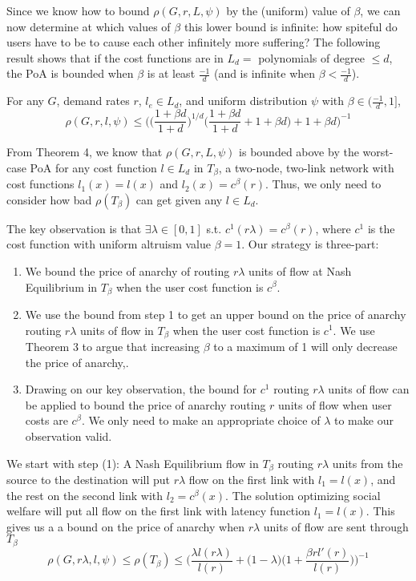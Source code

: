 Since we know how to bound $\rho(G,r,{L},\psi)$ by the (uniform) value of $\beta$, we can now determine at which values of $\beta$ this lower bound is infinite: how spiteful do users have to be to cause each other infinitely more suffering? The following result shows that if the cost functions are in $L_d =$ polynomials of degree $\le d$, the PoA is bounded when $\beta$ is at least $\frac{-1}{d}$ (and is infinite when $\beta < \frac{-1}d$).
\begin{theorem}
For any $G$, demand rates $r$, $l_e \in L_d$,
and uniform distribution $\psi$ with $\beta \in (\frac{-1}{d}, 1]$,
    $$\rho(G,r,l,\psi) \le \Big(\Big(\frac{1+\beta d}{1+d}\Big)^{1/d}\Big(\frac{1+\beta d}{1+d} + 1 + \beta d\Big)+ 1 + \beta d\Big)^{-1}$$
\end{theorem}
\begin{proof-sketch}
From Theorem 4, we know that 
$\rho(G,r,{L},\psi)$%
 is bounded above by the worst-case PoA for any cost function $l \in L_d$ in $T_\beta$, a two-node, two-link network with cost functions $l_1(x) = l(x)$ and $l_2(x) = c^\beta(r)$.
Thus, we only need to consider how bad $\rho(T_\beta)$ can get given any $l\in L_d$.

The key observation is that $\exists\lambda \in [0,1]$ s.t. $c^1(r\lambda) = c^\beta(r)$, where $c^1$ is the cost function with uniform altruism value $\beta=1$. Our strategy is three-part: 
\begin{enumerate}
    \item We bound the price of anarchy of routing $r\lambda$ units of flow at Nash Equilibrium in $T_\beta$ when the user cost function is $c^\beta$.
   \item We use the bound from step 1 to get an upper bound on the price of anarchy routing $r\lambda$ units of flow in $T_\beta$ when the user cost function is $c^1$. We use Theorem 3 to argue that increasing $\beta$ to a maximum of 1 will only decrease the price of anarchy,. 
    \item Drawing on our key observation, the bound for $c^1$ routing $r\lambda$ units of flow can be applied to bound the price of anarchy routing $r$ units of flow when user costs are $c^\beta$.
We only need to make an appropriate choice of $\lambda$ to make our observation valid.
\end{enumerate}

We start with step (1): A Nash Equilibrium flow in $T_\beta$ routing $r\lambda$ units from the source to the destination will put $r\lambda$ flow on the first link with $l_1 = l(x)$, and the rest on the second link with $l_2 = c^\beta(x)$. The solution optimizing social welfare will put all flow on the first link with latency function $l_1 = l(x)$.
This gives us a a bound on the price of anarchy when $r\lambda$ units of flow are sent through $T_\beta$ 
    $$\rho(G,r\lambda,l,\psi) \le \rho(T_\beta) \le \Big(\frac{\lambda l(r\lambda)}{l(r)} + \Big(1-\lambda\Big)\Big(1+\frac{\beta rl'(r)}{l(r)}\Big)\Big)^{-1}$$
    

\end{proof-sketch}
